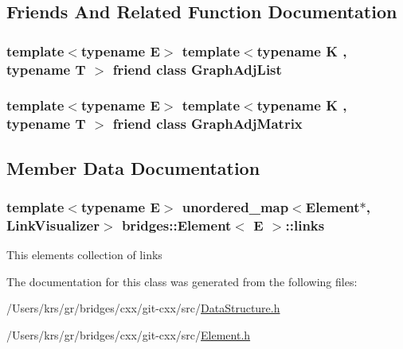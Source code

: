 \subsection{Friends And Related Function Documentation}
\hypertarget{classbridges_1_1_element_a1ec5df26ff2381673c41d5a8d1f222e2}{}
\subsubsection[{Graph\+Adj\+List}]{\setlength{\rightskip}{0pt plus 5cm}template$<$typename E$>$ template$<$typename K , typename T $>$ friend class {\bf Graph\+Adj\+List}\hspace{0.3cm}{\ttfamily [friend]}}\label{classbridges_1_1_element_a1ec5df26ff2381673c41d5a8d1f222e2}
\hypertarget{classbridges_1_1_element_ae8ba4af32b14c8ac8a3f8f861e914444}{}
\subsubsection[{Graph\+Adj\+Matrix}]{\setlength{\rightskip}{0pt plus 5cm}template$<$typename E$>$ template$<$typename K , typename T $>$ friend class {\bf Graph\+Adj\+Matrix}\hspace{0.3cm}{\ttfamily [friend]}}\label{classbridges_1_1_element_ae8ba4af32b14c8ac8a3f8f861e914444}


\subsection{Member Data Documentation}
\hypertarget{classbridges_1_1_element_a6fb53728edc378f26238543b26238496}{}
\subsubsection[{links}]{\setlength{\rightskip}{0pt plus 5cm}template$<$typename E$>$ unordered\+\_\+map$<${\bf Element}$\ast$, {\bf Link\+Visualizer}$>$ {\bf bridges\+::\+Element}$<$ E $>$\+::links\hspace{0.3cm}{\ttfamily [protected]}}\label{classbridges_1_1_element_a6fb53728edc378f26238543b26238496}
This element\textquotesingle{}s collection of links 

The documentation for this class was generated from the following files\+:\begin{DoxyCompactItemize}
\item 
/\+Users/krs/gr/bridges/cxx/git-\/cxx/src/\hyperlink{_data_structure_8h}{Data\+Structure.\+h}\item 
/\+Users/krs/gr/bridges/cxx/git-\/cxx/src/\hyperlink{_element_8h}{Element.\+h}\end{DoxyCompactItemize}
